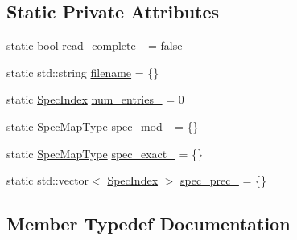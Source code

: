 \subsection*{Static Private Attributes}
\begin{DoxyCompactItemize}
\item 
static bool \hyperlink{structvt_1_1vrt_1_1collection_1_1balance_1_1_read_l_b_spec_af5c8b5f02b64bb47b59351d6facf465e}{read\+\_\+complete\+\_\+} = false
\item 
static std\+::string \hyperlink{structvt_1_1vrt_1_1collection_1_1balance_1_1_read_l_b_spec_a51ddefee7236d3128e5d906675d5a74d}{filename} = \{\}
\item 
static \hyperlink{namespacevt_1_1vrt_1_1collection_1_1balance_a72a5e0d9936ddf57f8e6c64e0e9fd123}{Spec\+Index} \hyperlink{structvt_1_1vrt_1_1collection_1_1balance_1_1_read_l_b_spec_ae97cd7f00965a8360c64342c4b3ac941}{num\+\_\+entries\+\_\+} = 0
\item 
static \hyperlink{structvt_1_1vrt_1_1collection_1_1balance_1_1_read_l_b_spec_a6b1c83bd61c581d9605941e2381432b9}{Spec\+Map\+Type} \hyperlink{structvt_1_1vrt_1_1collection_1_1balance_1_1_read_l_b_spec_a72033347ba73a23dd3494ead118e44d1}{spec\+\_\+mod\+\_\+} = \{\}
\item 
static \hyperlink{structvt_1_1vrt_1_1collection_1_1balance_1_1_read_l_b_spec_a6b1c83bd61c581d9605941e2381432b9}{Spec\+Map\+Type} \hyperlink{structvt_1_1vrt_1_1collection_1_1balance_1_1_read_l_b_spec_a40226a2163e4cc03bc48f766df0bb78d}{spec\+\_\+exact\+\_\+} = \{\}
\item 
static std\+::vector$<$ \hyperlink{namespacevt_1_1vrt_1_1collection_1_1balance_a72a5e0d9936ddf57f8e6c64e0e9fd123}{Spec\+Index} $>$ \hyperlink{structvt_1_1vrt_1_1collection_1_1balance_1_1_read_l_b_spec_a53d7c8950db9d6b4d8b7d895d0a264d0}{spec\+\_\+prec\+\_\+} = \{\}
\end{DoxyCompactItemize}


\subsection{Member Typedef Documentation}
\mbox{\label{structvt_1_1vrt_1_1collection_1_1balance_1_1_read_l_b_spec_ae6a9d2b206e9d005310031e2aa42767c}} 
